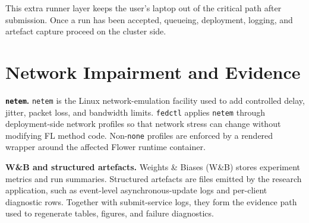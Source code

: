This extra runner layer keeps the user's laptop out of the critical path after submission. Once a run has been accepted, queueing, deployment, logging, and artefact capture proceed on the cluster side.

\section{Network Impairment and Evidence}
\label{def:network_evidence}

\begin{definition}
\textbf{\texttt{netem}.}
\texttt{netem} is the Linux network-emulation facility used to add controlled delay, jitter, packet loss, and bandwidth limits. \texttt{fedctl} applies \texttt{netem} through deployment-side network profiles so that network stress can change without modifying FL method code. Non-\texttt{none} profiles are enforced by a rendered wrapper around the affected Flower runtime container.
\end{definition}

\begin{definition}
\textbf{W\&B and structured artefacts.}
Weights \& Biases (W\&B) stores experiment metrics and run summaries. Structured artefacts are files emitted by the research application, such as event-level asynchronous-update logs and per-client diagnostic rows. Together with submit-service logs, they form the evidence path used to regenerate tables, figures, and failure diagnostics.
\end{definition}
